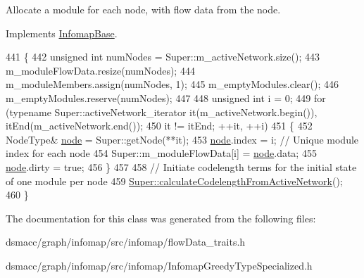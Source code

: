 Allocate a module for each node, with flow data from the node. 

Implements \mbox{\hyperlink{classInfomapBase_a8347fea5ed1cd22a27c7d972496e7d90}{Infomap\+Base}}.


\begin{DoxyCode}
441 \{
442     \textcolor{keywordtype}{unsigned} \textcolor{keywordtype}{int} numNodes = Super::m\_activeNetwork.size();
443     m\_moduleFlowData.resize(numNodes);
444     m\_moduleMembers.assign(numNodes, 1);
445     m\_emptyModules.clear();
446     m\_emptyModules.reserve(numNodes);
447 
448     \textcolor{keywordtype}{unsigned} \textcolor{keywordtype}{int} i = 0;
449     \textcolor{keywordflow}{for} (\textcolor{keyword}{typename} Super::activeNetwork\_iterator it(m\_activeNetwork.begin()), itEnd(m\_activeNetwork.end());
450             it != itEnd; ++it, ++i)
451     \{
452         NodeType& \mbox{\hyperlink{structnode}{node}} = Super::getNode(**it);
453         \mbox{\hyperlink{structnode}{node}}.index = i; \textcolor{comment}{// Unique module index for each node}
454         Super::m\_moduleFlowData[i] = \mbox{\hyperlink{structnode}{node}}.data;
455         \mbox{\hyperlink{structnode}{node}}.dirty = \textcolor{keyword}{true};
456     \}
457 
458     \textcolor{comment}{// Initiate codelength terms for the initial state of one module per node}
459     \mbox{\hyperlink{classInfomapGreedyCommon_ae168ab41c18759e09b1a3dff97ee017d}{Super::calculateCodelengthFromActiveNetwork}}();
460 \}
\end{DoxyCode}


The documentation for this class was generated from the following files\+:\begin{DoxyCompactItemize}
\item 
dsmacc/graph/infomap/src/infomap/flow\+Data\+\_\+traits.\+h\item 
dsmacc/graph/infomap/src/infomap/Infomap\+Greedy\+Type\+Specialized.\+h\end{DoxyCompactItemize}
